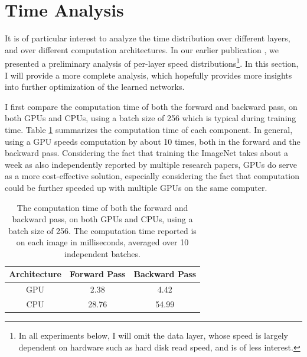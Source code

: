 \section{Time Analysis}
It is of particular interest to analyze the time distribution over different layers, and over different computation architectures. In our earlier publication \cite{donahue2013decaf}, we presented a preliminary analysis of per-layer speed distributions\footnote{In all experiments below, I will omit the data layer, whose speed is largely dependent on hardware such as hard disk read speed, and is of less interest.}. In this section, I will provide a more complete analysis, which hopefully provides more insights into further optimization of the learned networks.

I first compare the computation time of both the forward and backward pass, on both GPUs and CPUs, using a batch size of 256 which is typical during training time. Table \ref{table:caffe:time} summarizes the computation time of each component. In general, using a GPU speeds computation by about 10 times, both in the forward and the backward pass. Considering the fact that training the ImageNet takes about a week as also independently reported by multiple research papers, GPUs do serve as a more cost-effective solution, especially considering the fact that computation could be further speeded up with multiple GPUs on the same computer.

\begin{table}
  \centering
  \begin{tabular}{c|cc}
    \hline
    Architecture & Forward Pass & Backward Pass\\
    \hline
    GPU & 2.38 & 4.42 \\
    CPU & 28.76 & 54.99 \\
    \hline
  \end{tabular}
  \caption{The computation time of both the forward and backward pass, on both GPUs and CPUs, using a batch size of 256. The computation time reported is on each image in milliseconds, averaged over 10 independent batches.}\label{table:caffe:time}
\end{table}


